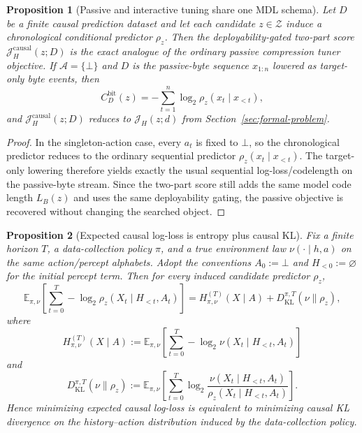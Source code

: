 \documentclass[11pt]{article}
\newtheorem{proposition}{Proposition}
\begin{document}
\begin{proposition}[Passive and interactive tuning share one MDL schema]
\label{prop:causal-mdl-unification}
Let $D$ be a finite causal prediction dataset and let each candidate
$z\in\mathcal{Z}$ induce a chronological conditional predictor $\rho_z$.
Then the deployability-gated two-part score
$\mathcal{J}_H^{\mathrm{causal}}(z;D)$ is the exact analogue of the ordinary
passive compression tuner objective. If $\mathcal{A}=\{\bot\}$ and $D$ is the
passive-byte sequence $x_{1:n}$ lowered as target-only byte events, then
\[
C_D^{\mathrm{bit}}(z)
=
-\sum_{t=1}^{n}\log_2\rho_z(x_t\mid x_{<t}),
\]
and $\mathcal{J}_H^{\mathrm{causal}}(z;D)$ reduces to
$\mathcal{J}_H(z;d)$ from Section~\ref{sec:formal-problem}.
\end{proposition}

\begin{proof}
In the singleton-action case, every $a_t$ is fixed to $\bot$, so the
chronological predictor reduces to the ordinary sequential predictor
$\rho_z(x_t\mid x_{<t})$. The target-only lowering therefore yields exactly the
usual sequential log-loss/codelength on the passive-byte stream. Since the
two-part score still adds the same model code length $L_B(z)$ and uses the same
deployability gating, the passive objective is recovered without changing the
searched object.
\end{proof}

\begin{proposition}[Expected causal log-loss is entropy plus causal KL]
\label{prop:causal-kl}
Fix a finite horizon $T$, a data-collection policy $\pi$, and a true
environment law $\nu(\cdot\mid h,a)$ on the same action/percept alphabets.
Adopt the conventions $A_0:=\bot$ and $H_{<0}:=\varnothing$ for the initial
percept term.
Then for every induced candidate predictor $\rho_z$,
\[
\mathbb{E}_{\pi,\nu}
\left[
\sum_{t=0}^{T}
-\log_2 \rho_z(X_t\mid H_{<t},A_t)
\right]
=
H_{\pi,\nu}^{(T)}(X\mid A)
+
D_{\mathrm{KL}}^{\pi,T}(\nu\|\rho_z),
\]
where
\[
H_{\pi,\nu}^{(T)}(X\mid A)
:=
\mathbb{E}_{\pi,\nu}
\left[
\sum_{t=0}^{T}
-\log_2 \nu(X_t\mid H_{<t},A_t)
\right]
\]
and
\[
D_{\mathrm{KL}}^{\pi,T}(\nu\|\rho_z)
:=
\mathbb{E}_{\pi,\nu}
\left[
\sum_{t=0}^{T}
\log_2
\frac{\nu(X_t\mid H_{<t},A_t)}{\rho_z(X_t\mid H_{<t},A_t)}
\right].
\]
Hence minimizing expected causal log-loss is equivalent to minimizing causal
KL divergence on the history--action distribution induced by the data-collection
policy.
\end{proposition}
\end{document}

